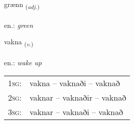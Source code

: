 \documentclass[frontgrid, backgrid]{flacards}\usepackage[]{graphicx}\usepackage[]{xcolor}
\begin{document}
\renewcommand{\flhead}{\vskip5pt \fboxsep=0pt {\small\bfseries\footnotesize Lýsingarorð | Adjective}}
\renewcommand{\fcfoot}{\vskip5pt \fboxsep=0pt \hspace{2pt}{\small\bfseries\footnotesize 2K}}

\renewcommand{\blhead}{\vskip5pt {\small\bfseries\footnotesize Lýsingarorð | Adjective }}
\renewcommand{\bcfoot}{\vskip5pt \hspace{2pt}{\small\bfseries\footnotesize 2K}}


{grænn \small{\textsubscript{(\textit{adj.})}} \\[1ex] %
\textphonetic{[kraitn̥]} \\
en.: \emph{green} \\  [2ex]
\renewcommand*{\arraystretch}{0.8}
}

\renewcommand{\flhead}{\vskip5pt \fboxsep=0pt {\small\bfseries\footnotesize Sagnorð | Verb}}
\renewcommand{\fcfoot}{\vskip5pt \fboxsep=0pt \hspace{2pt}{\small\bfseries\footnotesize 2K}}

\renewcommand{\blhead}{\vskip5pt {\small\bfseries\footnotesize Sagnorð | Verb }}
\renewcommand{\bcfoot}{\vskip5pt \hspace{2pt}{\small\bfseries\footnotesize 2K}}


{vakna \small{\textsubscript{(\textit{v.})}} \\[1ex] %
\textphonetic{[vahkna]} \\
en.: \emph{wake up} \\  [2ex]
\renewcommand*{\arraystretch}{0.8}
\begin{tabular}{p{1cm}l}
\textsc{1sg}: & vakna -- vaknaði -- vaknað \\ 
\textsc{2sg}: & vaknar -- vaknaðir -- vaknað \\ 
\textsc{3sg}: & vaknar -- vaknaði -- vaknað \\ 
\end{tabular}
}
\end{document}
